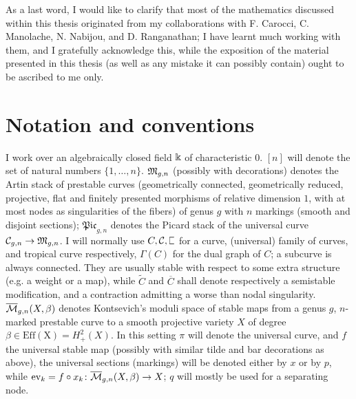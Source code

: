 As a last word, I would like to clarify that most of the mathematics discussed within this thesis originated from my collaborations with F. Carocci, C. Manolache, N. Nabijou, and D. Ranganathan; I have learnt much working with them, and I gratefully acknowledge this, while the exposition of the material presented in this thesis (as well as any mistake it can possibly contain) ought to be ascribed to me only.

\section*{Notation and conventions}
I work over an algebraically closed field $\Bbbk$ of characteristic $0$. $[n]$ will denote the set of natural numbers $\{1,\ldots,n\}$. $\mathfrak M_{g,n}$ (possibly with decorations) denotes the Artin stack of prestable curves (geometrically connected, geometrically reduced, projective, flat and finitely presented morphisms of relative dimension $1$, with at most nodes as singularities of the fibers) of genus $g$ with $n$ markings (smooth and disjoint sections); $\mathfrak{Pic}_{g,n}$ denotes the Picard stack of the universal curve $\mathcal C_{g,n}\rightarrow\mathfrak M_{g,n}$. I will normally use $C,\mathcal C,\plC$ for a curve, (universal) family of curves, and tropical curve respectively, $\Gamma(C)$ for the dual graph of $C$; a subcurve is always connected. They are usually stable with respect to some extra structure (e.g. a weight or a map), while $\widetilde{C}$ and $\overline{C}$ shall denote respectively a semistable modification, and a contraction admitting a worse than nodal singularity. $\overline{\mathcal{M}}_{g,n}(X,\beta)$ denotes Kontsevich's moduli space of stable maps from a genus $g$, $n$-marked prestable curve to a smooth projective variety $X$ of degree $\beta\in\operatorname{Eff(X)}=H^2_+(X)$. In this setting $\pi$ will denote the universal curve, and $f$ the universal stable map (possibly with similar tilde and bar decorations as above), the universal sections (markings) will be denoted either by $x$ or by $p$, while $\operatorname{ev}_k=f\circ x_k\colon \overline{\mathcal{M}}_{g,n}(X,\beta)\rightarrow X$; $q$ will mostly be used for a separating node.
